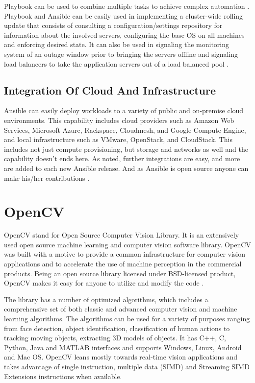 \documentclass[9pt,twocolumn,twoside]{../../styles/osajnl}
\begin{document}
Playbook can be used to combine multiple tasks to achieve complex
automation \cite{www-ansible5}. Playbook and Ansible can be easily used
in implementing a cluster-wide rolling update that consists of
consulting a configuration/settings repository for information about
the involved servers, configuring the base OS on all machines and
enforcing desired state. It can also be used in signaling the
monitoring system of an outage window prior to bringing the servers
offline and signaling load balancers to take the application servers
out of a load balanced pool \cite{www-ansible}.

\subsection{Integration Of Cloud And Infrastructure}

Ansible can easily deploy workloads to a variety of public and
on-premise cloud environments. This capability includes cloud
providers such as Amazon Web Services, Microsoft Azure, Rackspace,
Cloudmesh, and Google Compute Engine, and local infrastructure such as
VMware, OpenStack, and CloudStack. This includes not just compute
provisioning, but storage and networks as well and the capability
doesn't ends here. As noted, further integrations are easy, and more
are added to each new Ansible release. And as Ansible is open source
anyone can make his/her contributions \cite{www-ansible}.

\section{OpenCV}
OpenCV stand for Open Source Computer Vision Library. It is an
extensively used open source machine learning and computer vision
software library. OpenCV was built with a motive to provide a common
infrastructure for computer vision applications and to accelerate the
use of machine perception in the commercial products. Being an open
source library licensed under BSD-licensed product, OpenCV makes it
easy for anyone to utilize and modify the code \cite{www-opencv}.

The library has a number of optimized algorithms, which includes a
comprehensive set of both classic and advanced computer vision and
machine learning algorithms. The algorithms can be used for a variety
of purposes ranging from face detection, object identification,
classification of human actions to tracking moving objects, extracting
3D models of objects. It has C++, C, Python, Java and MATLAB
interfaces and supports Windows, Linux, Android and Mac OS. OpenCV
leans mostly towards real-time vision applications and takes advantage
of single instruction, multiple data (SIMD) and Streaming SIMD
Extensions instructions when available.
\end{document}
